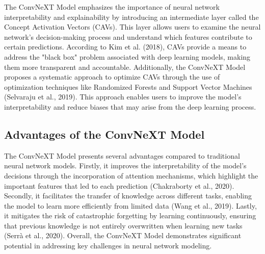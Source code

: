 \documentclass[12pt,oneside]{report}
\begin{document}
The ConvNeXT Model emphasizes the importance of neural network interpretability and explainability by introducing an intermediate layer called the Concept Activation Vectors (CAVs). This layer allows users to examine the neural network's decision-making process and understand which features contribute to certain predictions. According to Kim et al. (2018), CAVs provide a means to address the "black box" problem associated with deep learning models, making them more transparent and accountable. Additionally, the ConvNeXT Model proposes a systematic approach to optimize CAVs through the use of optimization techniques like Randomized Forests and Support Vector Machines (Selvaraju et al., 2019). This approach enables users to improve the model's interpretability and reduce biases that may arise from the deep learning process.

\subsection{Advantages of the ConvNeXT Model}
The ConvNeXT Model presents several advantages compared to traditional neural network models. Firstly, it improves the interpretability of the model's decisions through the incorporation of attention mechanisms, which highlight the important features that led to each prediction (Chakraborty et al., 2020). Secondly, it facilitates the transfer of knowledge across different tasks, enabling the model to learn more efficiently from limited data (Wang et al., 2019). Lastly, it mitigates the risk of catastrophic forgetting by learning continuously, ensuring that previous knowledge is not entirely overwritten when learning new tasks (Serrà et al., 2020). Overall, the ConvNeXT Model demonstrates significant potential in addressing key challenges in neural network modeling.
\end{document}
